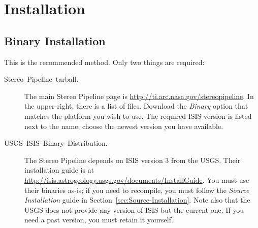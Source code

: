 \chapter{Installation}

\section{Binary Installation}

This is the recommended method. Only two things are required:

\begin{description}
\item [{Stereo~Pipeline~tarball.}] The main Stereo Pipeline page is \url{http://ti.arc.nasa.gov/stereopipeline}.
In the upper-right, there is a list of files. Download the \emph{Binary}
option that matches the platform you wish to use. The required \ac{ISIS}
version is listed next to the name; choose the newest version you
have available.

\item [{USGS~ISIS~Binary~Distribution.}] The Stereo Pipeline depends
on \ac{ISIS} version 3 from the \ac{USGS}\@. Their installation guide is at \url{http://isis.astrogeology.usgs.gov/documents/InstallGuide}.
You must use their binaries as-is; if you need to recompile, you must
follow the \emph{Source Installation} guide in Section~\ref{sec:Source-Installation}.
Note also that the \ac{USGS} does not provide any version of \ac{ISIS} but the
current one. If you need a past version, you must retain it yourself.
\end{description}

